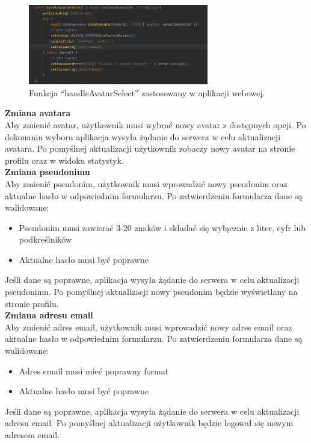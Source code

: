 \begin{figure}[H]
    \centering
    \includegraphics[width=0.7\textwidth]{chapters/chapter_8/screens/edit_user_web}
    \caption{Funkcja “handleAvatarSelect” zastosowany w aplikacji webowej.}
    \label{img:edit_user_web}
\end{figure}

\textbf{Zmiana avatara}\\
Aby zmienić avatar, użytkownik musi wybrać nowy avatar z dostępnych opcji. Po dokonaniu wyboru aplikacja wysyła żądanie do serwera w celu aktualizacji avatara. Po pomyślnej aktualizacji użytkownik zobaczy nowy avatar na stronie profilu oraz w widoku statystyk.\\


\textbf{Zmiana pseudonimu}\\
Aby zmienić pseudonim, użytkownik musi wprowadzić nowy pseudonim oraz aktualne hasło w odpowiednim formularzu. Po zatwierdzeniu formularza dane są walidowane:
\begin{itemize}
    \item Pseudonim musi zawierać 3-20 znaków i składać się wyłącznie z liter, cyfr lub podkreślników
    \item Aktualne hasło musi być poprawne
\end{itemize}
Jeśli dane są poprawne, aplikacja wysyła żądanie do serwera w celu aktualizacji pseudonimu. Po pomyślnej aktualizacji nowy pseudonim będzie wyświetlany na stronie profilu.\\


\textbf{Zmiana adresu email}\\
Aby zmienić adres email, użytkownik musi wprowadzić nowy adres email oraz aktualne hasło w odpowiednim formularzu. Po zatwierdzeniu formularza dane są walidowane:
\begin{itemize}
    \item Adres email musi mieć poprawny format
    \item Aktualne hasło musi być poprawne
\end{itemize}
Jeśli dane są poprawne, aplikacja wysyła żądanie do serwera w celu aktualizacji adresu email. Po pomyślnej aktualizacji użytkownik będzie logował się nowym adresem email.\\



